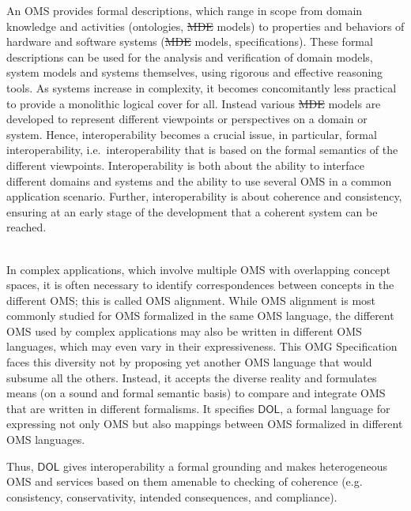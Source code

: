 \documentclass[10pt, a4paper]{isov2}
\makeatletter
\newcommand{\ec}[0]{~\\{{\color{violet}\large \hrulefill {\normalfont{end}} \hrulefill\\}  }}
\newcommand*{\eg}{e.g.\@\xspace}
\newcommand*{\IS}{OMG Specification\xspace}
\newcommand*{\DOL}{\ensuremath{\mathsf{DOL}}\xspace}
\providecommand{\DIFdeltex}[1]{{\protect\color{red}\sout{#1}}}                      %
\providecommand{\DIFdelbegin}{} %
\providecommand{\DIFdelend}{} %
\providecommand{\DIFdel}[1]{\texorpdfstring{\DIFdeltex{#1}}{}} %
\makeatother
\begin{document}
An OMS provides formal descriptions, which range in scope from domain knowledge and activities
(ontologies, \DIFdelbegin \DIFdel{MDE }\DIFdelend models) to properties and behaviors of hardware and software systems (\DIFdelbegin \DIFdel{MDE }\DIFdelend models,
specifications). These formal descriptions can be used for the analysis and verification of domain
models, system models and systems themselves, using rigorous and effective reasoning tools.   As 
systems increase in complexity, it becomes concomitantly less practical to provide a monolithic 
logical cover for all.  Instead various \DIFdelbegin \DIFdel{MDE }\DIFdelend models are developed to represent different viewpoints or 
perspectives on a domain or system. 
 Hence, interoperability becomes
a crucial issue, in particular, formal interoperability, i.e.\ interoperability that is based on
the formal semantics of the different viewpoints. Interoperability is both about the ability to 
interface different domains and systems and the ability to use several OMS in a common application
scenario. Further,  interoperability is about coherence and consistency, ensuring at an early stage of the development
that a coherent system can be reached.
\ec

In complex applications, which involve multiple OMS with overlapping concept spaces,
it is often necessary to identify correspondences between concepts in the different OMS; this is called  OMS alignment. 
While OMS alignment is most commonly studied for OMS formalized in the same OMS 
language, the different OMS used by complex applications may also be written in different 
OMS languages, which may even vary in their expressiveness. 
This \IS faces this diversity not by proposing yet another OMS language that would subsume all the others.  
Instead, it accepts the diverse reality and formulates means (on a sound and formal semantic basis) 
to compare and integrate OMS that are written in different formalisms.
It specifies \DOL, a formal language for
expressing not only OMS but also mappings between OMS formalized in different OMS languages.

Thus, \DOL gives interoperability a formal grounding and makes heterogeneous OMS and services based
on them amenable to checking of coherence (\eg consistency, conservativity, intended consequences,
and compliance).


\end{document}
